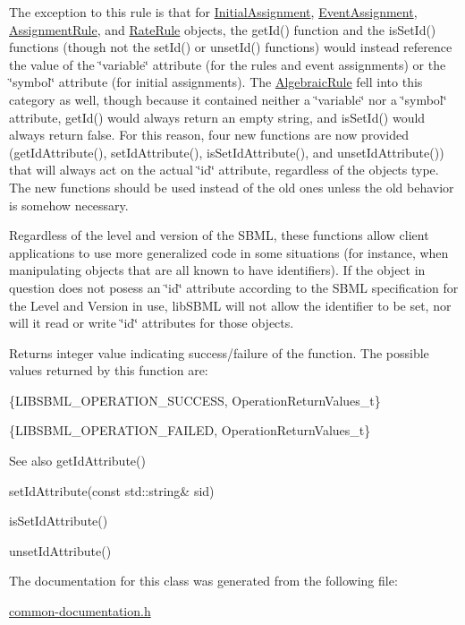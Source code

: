 The exception to this rule is that for \hyperlink{class_initial_assignment}{Initial\+Assignment}, \hyperlink{class_event_assignment}{Event\+Assignment}, \hyperlink{class_assignment_rule}{Assignment\+Rule}, and \hyperlink{class_rate_rule}{Rate\+Rule} objects, the get\+Id() function and the is\+Set\+Id() functions (though not the set\+Id() or unset\+Id() functions) would instead reference the value of the \char`\"{}variable\char`\"{} attribute (for the rules and event assignments) or the \char`\"{}symbol\char`\"{} attribute (for initial assignments). The \hyperlink{class_algebraic_rule}{Algebraic\+Rule} fell into this category as well, though because it contained neither a \char`\"{}variable\char`\"{} nor a \char`\"{}symbol\char`\"{} attribute, get\+Id() would always return an empty string, and is\+Set\+Id() would always return {\ttfamily false}. For this reason, four new functions are now provided (get\+Id\+Attribute(), set\+Id\+Attribute(), is\+Set\+Id\+Attribute(), and unset\+Id\+Attribute()) that will always act on the actual \char`\"{}id\char`\"{} attribute, regardless of the object\textquotesingle{}s type. The new functions should be used instead of the old ones unless the old behavior is somehow necessary.

Regardless of the level and version of the S\+B\+ML, these functions allow client applications to use more generalized code in some situations (for instance, when manipulating objects that are all known to have identifiers). If the object in question does not posess an \char`\"{}id\char`\"{} attribute according to the S\+B\+ML specification for the Level and Version in use, lib\+S\+B\+ML will not allow the identifier to be set, nor will it read or write \char`\"{}id\char`\"{} attributes for those objects.

\begin{DoxyReturn}{Returns}
integer value indicating success/failure of the function. The possible values returned by this function are\+: \begin{DoxyItemize}
\item \{L\+I\+B\+S\+B\+M\+L\+\_\+\+O\+P\+E\+R\+A\+T\+I\+O\+N\+\_\+\+S\+U\+C\+C\+E\+SS, Operation\+Return\+Values\+\_\+t\} \item \{L\+I\+B\+S\+B\+M\+L\+\_\+\+O\+P\+E\+R\+A\+T\+I\+O\+N\+\_\+\+F\+A\+I\+L\+ED, Operation\+Return\+Values\+\_\+t\}\end{DoxyItemize}

\end{DoxyReturn}
\begin{DoxySeeAlso}{See also}
get\+Id\+Attribute() 

set\+Id\+Attribute(const std\+::string\& sid) 

is\+Set\+Id\+Attribute() 

unset\+Id\+Attribute() 
\end{DoxySeeAlso}


The documentation for this class was generated from the following file\+:\begin{DoxyCompactItemize}
\item 
\hyperlink{common-documentation_8h}{common-\/documentation.\+h}\end{DoxyCompactItemize}
